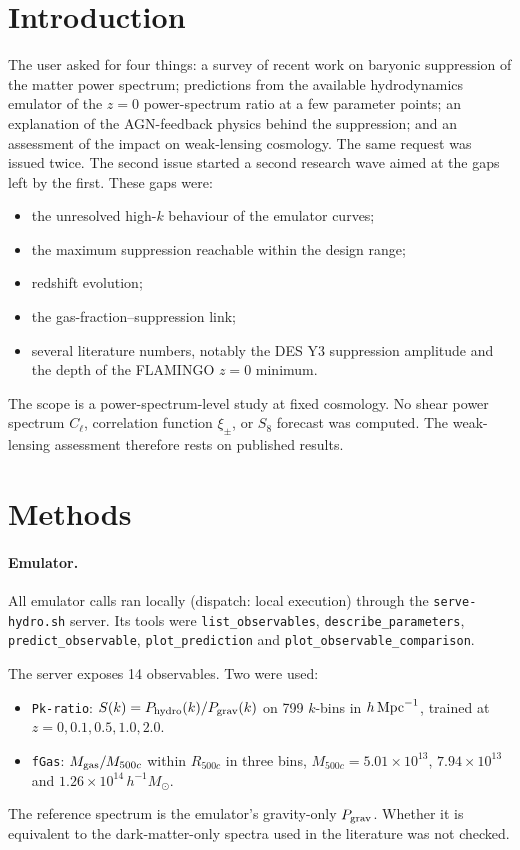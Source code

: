 \documentclass[11pt,a4paper]{article}
\begin{document}
\section{Introduction}
The user asked for four things: a survey of recent work on baryonic suppression of the matter power spectrum; predictions from the available hydrodynamics emulator of the $z=0$ power-spectrum ratio at a few parameter points; an explanation of the AGN-feedback physics behind the suppression; and an assessment of the impact on weak-lensing cosmology. The same request was issued twice. The second issue started a second research wave aimed at the gaps left by the first. These gaps were:
\begin{itemize}
\item the unresolved high-$k$ behaviour of the emulator curves;
\item the maximum suppression reachable within the design range;
\item redshift evolution;
\item the gas-fraction--suppression link;
\item several literature numbers, notably the DES Y3 suppression amplitude and the depth of the FLAMINGO $z=0$ minimum.
\end{itemize}

The scope is a power-spectrum-level study at fixed cosmology. No shear power spectrum $C_\ell$, correlation function $\xi_\pm$, or $S_8$ forecast was computed. The weak-lensing assessment therefore rests on published results.

\section{Methods}
\paragraph{Emulator.} All emulator calls ran locally (dispatch: local execution) through the \texttt{serve-hydro.sh} server. Its tools were \texttt{list\_observables}, \texttt{describe\_parameters}, \texttt{predict\_observable}, \texttt{plot\_prediction} and \texttt{plot\_observable\_comparison}.

The server exposes 14 observables. Two were used:
\begin{itemize}
\item \texttt{Pk-ratio}: $S(k)=P_{\rm hydro}(k)/P_{\rm grav}(k)$ on 799 $k$-bins in $h\,{\rm Mpc}^{-1}$, trained at $z=0,0.1,0.5,1.0,2.0$.
\item \texttt{fGas}: $M_{\rm gas}/M_{500c}$ within $R_{500c}$ in three bins, $M_{500c}=5.01\times10^{13}$, $7.94\times10^{13}$ and $1.26\times10^{14}\,h^{-1}M_\odot$.
\end{itemize}
The reference spectrum is the emulator's gravity-only $P_{\rm grav}$. Whether it is equivalent to the dark-matter-only spectra used in the literature was not checked.
\end{document}
